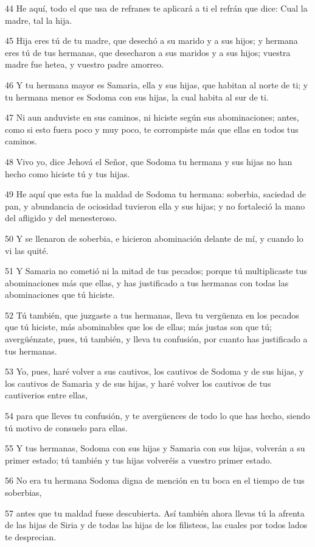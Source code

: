 \par 44 He aquí, todo el que usa de refranes te aplicará a ti el refrán que dice: Cual la madre, tal la hija.
\par 45 Hija eres tú de tu madre, que desechó a su marido y a sus hijos; y hermana eres tú de tus hermanas, que desecharon a sus maridos y a sus hijos; vuestra madre fue hetea, y vuestro padre amorreo.
\par 46 Y tu hermana mayor es Samaria, ella y sus hijas, que habitan al norte de ti; y tu hermana menor es Sodoma con sus hijas, la cual habita al sur de ti.
\par 47 Ni aun anduviste en sus caminos, ni hiciste según sus abominaciones; antes, como si esto fuera poco y muy poco, te corrompiste más que ellas en todos tus caminos.
\par 48 Vivo yo, dice Jehová el Señor, que Sodoma tu hermana y sus hijas no han hecho como hiciste tú y tus hijas.
\par 49 He aquí que esta fue la maldad de Sodoma tu hermana: soberbia, saciedad de pan, y abundancia de ociosidad tuvieron ella y sus hijas; y no fortaleció la mano del afligido y del menesteroso.
\par 50 Y se llenaron de soberbia, e hicieron abominación delante de mí, y cuando lo vi las quité.
\par 51 Y Samaria no cometió ni la mitad de tus pecados; porque tú multiplicaste tus abominaciones más que ellas, y has justificado a tus hermanas con todas las abominaciones que tú hiciste. 
\par 52 Tú también, que juzgaste a tus hermanas, lleva tu vergüenza en los pecados que tú hiciste, más abominables que los de ellas; más justas son que tú; avergüénzate, pues, tú también, y lleva tu confusión, por cuanto has justificado a tus hermanas.
\par 53 Yo, pues, haré volver a sus cautivos, los cautivos de Sodoma y de sus hijas, y los cautivos de Samaria y de sus hijas, y haré volver los cautivos de tus cautiverios entre ellas,
\par 54 para que lleves tu confusión, y te avergüences de todo lo que has hecho, siendo tú motivo de consuelo para ellas.
\par 55 Y tus hermanas, Sodoma con sus hijas y Samaria con sus hijas, volverán a su primer estado; tú también y tus hijas volveréis a vuestro primer estado.
\par 56 No era tu hermana Sodoma digna de mención en tu boca en el tiempo de tus soberbias,
\par 57 antes que tu maldad fuese descubierta. Así también ahora llevas tú la afrenta de las hijas de Siria y de todas las hijas de los filisteos, las cuales por todos lados te desprecian.
